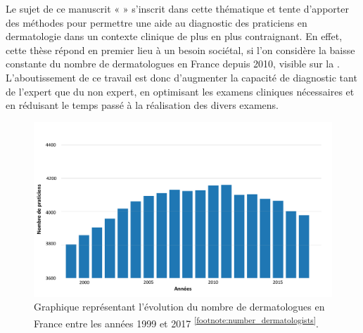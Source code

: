\addtocounter{footnote}{1}

Le sujet de ce manuscrit « \titleref » s’inscrit dans cette thématique et tente d’apporter des méthodes pour permettre une aide au diagnostic des praticiens en dermatologie dans un contexte clinique de plus en plus contraignant. En effet, cette thèse répond en premier lieu à un besoin sociétal, si l'on considère la baisse constante du nombre de dermatologues en France depuis 2010, visible sur la . L'aboutissement de ce travail est donc d'augmenter la capacité de diagnostic tant de l'expert que du non expert, en optimisant les examens cliniques nécessaires et en réduisant le temps passé à la réalisation des divers examens.\par

\begin{figure}[H]
    \centering
    \includegraphics[width=\linewidth]{contents/i_introduction/resources/evolution_dermatologists.pdf}
    \caption{Graphique représentant l'évolution du nombre de dermatologues en France entre les années 1999 et 2017 \textsuperscript{\ref{footnote:number_dermatologists}}.}
    \label{fig:number_dermatologists}
\end{figure}\par
\addtocounter{footnote}{1}

